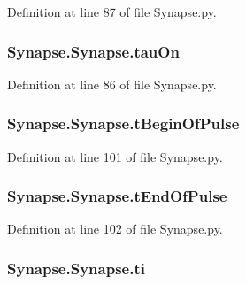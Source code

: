 Definition at line 87 of file Synapse.\-py.

\hypertarget{class_synapse_1_1_synapse_aae46f8edd1e94ea2ab51e3612afd3a3f}{
\subsubsection[{tau\-On}]{\setlength{\rightskip}{0pt plus 5cm}Synapse.\-Synapse.\-tau\-On}}\label{class_synapse_1_1_synapse_aae46f8edd1e94ea2ab51e3612afd3a3f}


Definition at line 86 of file Synapse.\-py.

\hypertarget{class_synapse_1_1_synapse_acdc426c52a2a13183d5f8c54a830bfa2}{
\subsubsection[{t\-Begin\-Of\-Pulse}]{\setlength{\rightskip}{0pt plus 5cm}Synapse.\-Synapse.\-t\-Begin\-Of\-Pulse}}\label{class_synapse_1_1_synapse_acdc426c52a2a13183d5f8c54a830bfa2}


Definition at line 101 of file Synapse.\-py.

\hypertarget{class_synapse_1_1_synapse_adfd02fa815d45efd0cb1bc0124fe2c90}{
\subsubsection[{t\-End\-Of\-Pulse}]{\setlength{\rightskip}{0pt plus 5cm}Synapse.\-Synapse.\-t\-End\-Of\-Pulse}}\label{class_synapse_1_1_synapse_adfd02fa815d45efd0cb1bc0124fe2c90}


Definition at line 102 of file Synapse.\-py.

\hypertarget{class_synapse_1_1_synapse_a714c95723607acad52af96ad55b6c575}{
\subsubsection[{ti}]{\setlength{\rightskip}{0pt plus 5cm}Synapse.\-Synapse.\-ti}}\label{class_synapse_1_1_synapse_a714c95723607acad52af96ad55b6c575}


